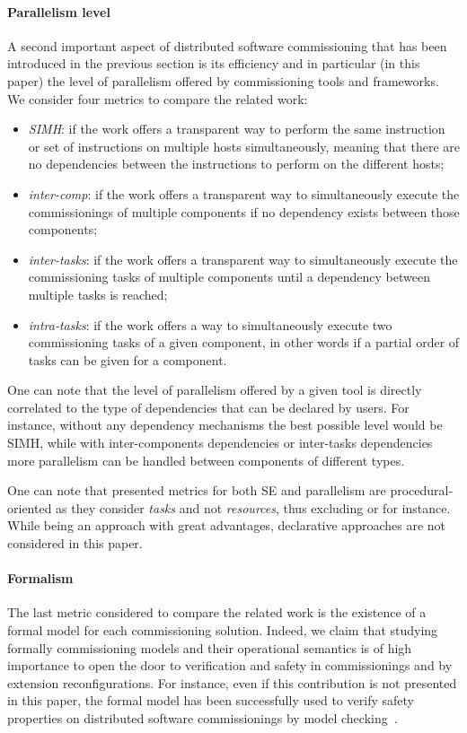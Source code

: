 \paragraph{Parallelism level}
A second important aspect of distributed software commissioning that
has been introduced in the previous section is its efficiency and in
particular (in this paper) the level of parallelism offered by
commissioning tools and frameworks. We consider four metrics to
compare the related work:
\begin{itemize}
\item \emph{SIMH}: if the work offers a transparent way to perform the
  same instruction or set of instructions on multiple hosts
  simultaneously, meaning that there are no dependencies between the
  instructions to perform on the different hosts;
  \item \emph{inter-comp}: if the work offers a transparent way to
    simultaneously execute the commissionings of multiple components
    if no dependency exists between those components;
  \item \emph{inter-tasks}: if the work offers a transparent way to
    simultaneously execute the commissioning tasks of multiple
    components until a dependency between multiple tasks is reached;
  \item \emph{intra-tasks}: if the work offers a way to simultaneously
    execute two commissioning tasks of a given component, in other
    words if a partial order of tasks can be given for a component.
\end{itemize}
One can note that the level of parallelism offered by a given tool is
directly correlated to the type of dependencies that can be declared
by users. For instance, without any dependency mechanisms the best
possible level would be SIMH, while with inter-components dependencies
or inter-tasks dependencies more parallelism can be handled between
components of different types.

One can note that presented metrics for both SE and parallelism are
procedural-oriented as they consider \emph{tasks} and not
\emph{resources}, thus excluding \puppet or \salt for instance. While
being an approach with great advantages, declarative approaches are
not considered in this paper.

\paragraph{Formalism}
The last metric considered to compare the related work is the
existence of a formal model for each commissioning solution. Indeed,
we claim that studying formally commissioning models and their
operational semantics is of high importance to open the door to
verification and safety in commissionings and by extension
reconfigurations. For instance, even if this contribution is not
presented in this paper, the formal model \mad has been
successfully used to verify safety properties on distributed software
commissionings by model checking~\cite{}.

